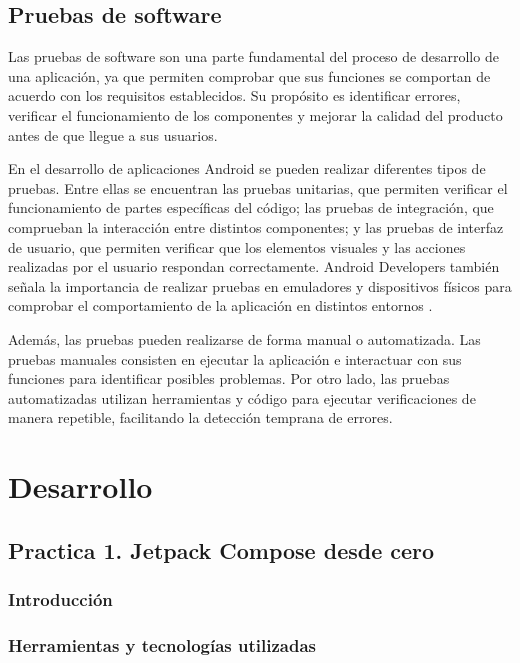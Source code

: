 \documentclass[12pt,a4paper]{article}
\begin{document}
 

\subsection{Pruebas de software}
Las pruebas de software son una parte fundamental del proceso de desarrollo de una aplicación, ya que permiten comprobar que sus funciones se comportan de acuerdo con los requisitos establecidos. Su propósito es identificar errores, verificar el funcionamiento de los componentes y mejorar la calidad del producto antes de que llegue a sus usuarios.

En el desarrollo de aplicaciones Android se pueden realizar diferentes tipos de pruebas. Entre ellas se encuentran las pruebas unitarias, que permiten verificar el funcionamiento de partes específicas del código; las pruebas de integración, que comprueban la interacción entre distintos componentes; y las pruebas de interfaz de usuario, que permiten verificar que los elementos visuales y las acciones realizadas por el usuario respondan correctamente. Android Developers también señala la importancia de realizar pruebas en emuladores y dispositivos físicos para comprobar el comportamiento de la aplicación en distintos entornos \parencite{androidTesting}.

Además, las pruebas pueden realizarse de forma manual o automatizada. Las pruebas manuales consisten en ejecutar la aplicación e interactuar con sus funciones para identificar posibles problemas. Por otro lado, las pruebas automatizadas utilizan herramientas y código para ejecutar verificaciones de manera repetible, facilitando la detección temprana de errores.

\section{Desarrollo}

\subsection{Practica 1. Jetpack Compose desde cero }

\subsubsection{Introducción}

\subsubsection{Herramientas y tecnologías utilizadas}
\end{document}
